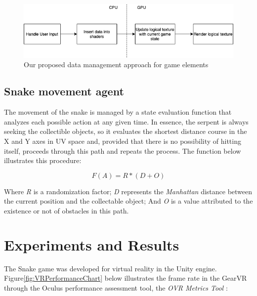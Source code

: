 \documentclass[runningheads]{llncs}
\begin{document}
\begin{figure}[h]
\centering
\includegraphics[width=\textwidth]{hci2020-paper/images/VRSnake_GameObjectData_Management.png}
\caption{Our proposed data management approach for game elements}
\label{fig:VR_GameObjectData_Management}
\end{figure}

\subsection{Snake movement agent} \label{sec:agent}
The movement of the snake is managed by a state evaluation function that analyzes each possible action at any given time. In essence, the serpent is always seeking  the collectible objects, so it evaluates the shortest distance course in the X and Y axes in UV space and, provided that there is no possibility of hitting itself, proceeds through this path and repeats the process. The function below illustrates this procedure:

\begin{equation}
F(A) = R * (D + O)
\label{equation11}
\end{equation}

Where \textit{R} is a randomization factor; \textit{D} represents the \textit{Manhattan} distance between the current position and the collectable object; And \textit{O} is a value attributed to the existence or not of obstacles in this path.

\section{Experiments and Results} \label{sec:results}
The Snake game was developed for virtual reality in the Unity engine. Figure\ref{fig:VRPerformanceChart}  below illustrates the frame rate in the GearVR through the Oculus performance assessment tool, the \textit{OVR Metrics Tool} \cite{ovrmetrictool}:
\end{document}
